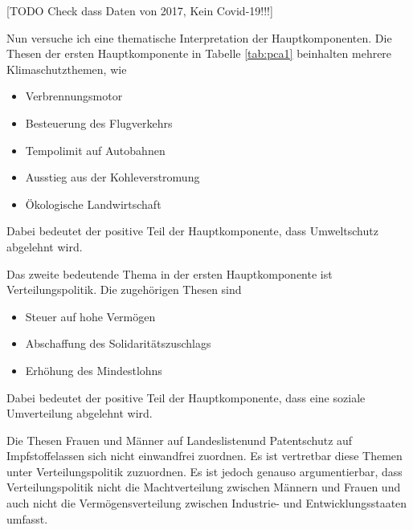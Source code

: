 \begin{table}%
	\centering
	\caption{TODO caption}
	\label{tab:pca2}
\end{table}
[TODO Check dass Daten von 2017, Kein Covid-19!!!]

Nun versuche ich eine thematische Interpretation der Hauptkomponenten. Die Thesen der ersten Hauptkomponente in Tabelle \ref{tab:pca1} beinhalten mehrere Klimaschutzthemen, wie
\begin{itemize}
	\item Verbrennungsmotor
	\item Besteuerung des Flugverkehrs
	\item Tempolimit auf Autobahnen
	\item Ausstieg aus der Kohleverstromung
	\item Ökologische Landwirtschaft
\end{itemize}
Dabei bedeutet der positive Teil der Hauptkomponente, dass Umweltschutz abgelehnt wird.

Das zweite bedeutende Thema in der ersten Hauptkomponente ist Verteilungspolitik. Die zugehörigen Thesen sind
\begin{itemize}
	\item Steuer auf hohe Vermögen
	\item Abschaffung des Solidaritätszuschlags
	\item Erhöhung des Mindestlohns
\end{itemize}
Dabei bedeutet der positive Teil der Hauptkomponente, dass eine soziale Umverteilung abgelehnt wird.

Die Thesen \glqq Frauen und Männer auf Landeslisten\grqq und \glqq Patentschutz auf Impfstoffe\grqq lassen sich nicht einwandfrei zuordnen. Es ist vertretbar diese Themen unter Verteilungspolitik zuzuordnen. Es ist jedoch genauso argumentierbar, dass Verteilungspolitik nicht die Machtverteilung zwischen Männern und Frauen und auch nicht die Vermögensverteilung zwischen Industrie- und Entwicklungsstaaten umfasst.


